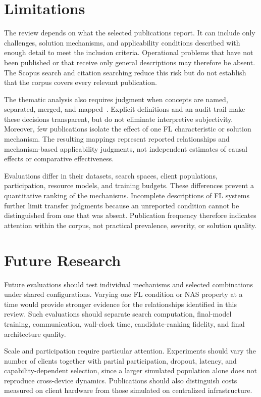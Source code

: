 \section{Limitations}

The review depends on what the selected publications report. It can include only challenges, solution mechanisms, and applicability conditions described with enough detail to meet the inclusion criteria. Operational problems that have not been published or that receive only general descriptions may therefore be absent. The Scopus search and citation searching reduce this risk but do not establish that the corpus covers every relevant publication.

The thematic analysis also requires judgment when concepts are named, separated, merged, and mapped~\cite{using_thematic_analysis_2006}. Explicit definitions and an audit trail make these decisions transparent, but do not eliminate interpretive subjectivity. Moreover, few publications isolate the effect of one FL characteristic or solution mechanism. The resulting mappings represent reported relationships and mechanism-based applicability judgments, not independent estimates of causal effects or comparative effectiveness.

Evaluations differ in their datasets, search spaces, client populations, participation, resource models, and training budgets. These differences prevent a quantitative ranking of the mechanisms. Incomplete descriptions of FL systems further limit transfer judgments because an unreported condition cannot be distinguished from one that was absent. Publication frequency therefore indicates attention within the corpus, not practical prevalence, severity, or solution quality.

\section{Future Research}

Future evaluations should test individual mechanisms and selected combinations under shared configurations. Varying one FL condition or NAS property at a time would provide stronger evidence for the relationships identified in this review. Such evaluations should separate search computation, final-model training, communication, wall-clock time, candidate-ranking fidelity, and final architecture quality.

Scale and participation require particular attention. Experiments should vary the number of clients together with partial participation, dropout, latency, and capability-dependent selection, since a larger simulated population alone does not reproduce cross-device dynamics. Publications should also distinguish costs measured on client hardware from those simulated on centralized infrastructure.

